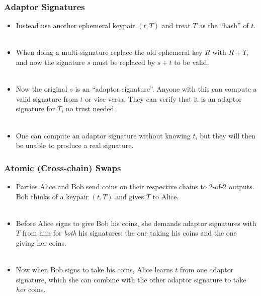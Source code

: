 \documentclass{beamer}
\begin{document}
\frame
{
  \frametitle{Adaptor Signatures}
  \begin{itemize}
  \item Instead use another ephemeral keypair $(t, T)$ and treat $T$ as the
        ``hash'' of $t$.\\~\\
  \item When doing a multi-signature replace the old ephemeral key $R$ with $R + T$,
        and now the signature $s$ must be replaced by $s + t$ to be valid.\\~\\
  \item Now the original $s$ is an ``adaptor signature''. Anyone with this can
        compute a valid signature from $t$ or vice-versa. They can verify
        that it is an adaptor signature for $T$, no trust needed.\\~\\
  \item One can compute an adaptor signature without knowing $t$, but they
        will then be unable to produce a real signature.
  \end{itemize}
}

\frame
{
  \frametitle{Atomic (Cross-chain) Swaps}

  \begin{itemize}
  \item Parties Alice and Bob send coins on their respective
        chains to 2-of-2 outputs. Bob thinks of a keypair $(t, T)$ and gives $T$ to
        Alice.\\~\\
  \item Before Alice signs to give Bob his coins, she demands adaptor signatures with $T$
        from him for \emph{both} his signatures: the one taking his coins and the one giving
        her coins.\\~\\
  \item Now when Bob signs to take his coins, Alice learns $t$ from one adaptor signature,
        which she can combine with the other adaptor signature to take \emph{her} coins.
  \end{itemize}
}
\end{document}
